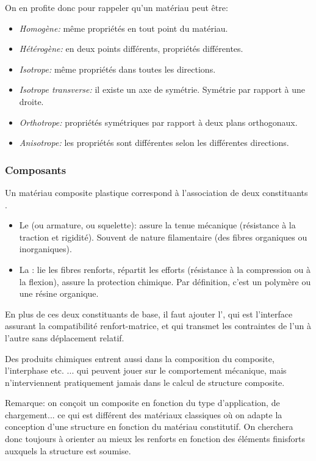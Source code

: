 On en profite donc pour rappeler qu'un matériau peut être:
\begin{itemize}
	\item \emph{Homogène:} même propriétés en tout point du matériau.
	\item \emph{Hétérogène:} en deux points différents, propriétés différentes.
	\item \emph{Isotrope:} même propriétés dans toutes les directions.
	\item \emph{Isotrope transverse:} il existe un axe de symétrie. Symétrie par rapport à une droite.
	\item \emph{Orthotrope:} propriétés symétriques par rapport à deux plans orthogonaux.
	\item \emph{Anisotrope:} les propriétés sont différentes selon les différentes directions.
\end{itemize}

\medskip
\subsubsection{Composants}

Un matériau composite plastique correspond à l'association de deux constituants .
\begin{itemize}
	\item Le  (ou armature, ou squelette): assure la tenue mécanique (résistance à la
		traction et rigidité). Souvent de nature filamentaire (des fibres organiques ou inorganiques).
	\item La : lie les fibres renforts, répartit les efforts (résistance à la compression
		ou à la flexion), assure la protection chimique. Par définition, c'est un polymère ou
		une résine organique.
\end{itemize}

\medskip
En plus de ces deux constituants de base, il faut ajouter l', qui est l'interface
assurant la compatibilité renfort-matrice, et qui transmet les contraintes de l'un à l'autre sans
 déplacement relatif.

\medskip
Des produits chimiques entrent aussi dans la composition du composite, l'interphase etc. ...
qui peuvent jouer sur le comportement mécanique, mais n'interviennent pratiquement
jamais dans le calcul de structure composite.

\medskip
{} Remarque: on conçoit un composite en fonction du type d'application, de chargement... ce qui est différent
des matériaux classiques où on adapte la conception d'une structure en fonction du matériau constitutif.
On cherchera donc toujours à orienter au mieux les renforts en fonction des éléments finisforts auxquels la structure
est soumise.

